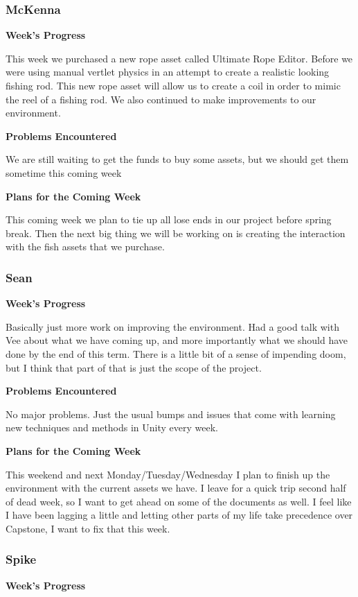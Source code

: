 \documentclass[10pt,journal,compsoc,onecolumn, draftclsnofoot]{IEEEtran}
\begin{document}
\subsubsection{McKenna}
\noindent \textbf{Week's Progress}

This week we purchased a new rope asset called Ultimate Rope Editor. Before we were using manual vertlet physics in an attempt to create a realistic looking fishing rod. This new rope asset will allow us to create a coil in order to mimic the reel of a fishing rod. We also continued to make improvements to our environment.

\noindent \textbf{Problems Encountered}

We are still waiting to get the funds to buy some assets, but we should get them sometime this coming week

\noindent \textbf{Plans for the Coming Week}

This coming week we plan to tie up all lose ends in our project before spring break. Then the next big thing we will be working on is creating the interaction with the fish assets that we purchase.

\subsubsection{Sean}
\noindent \textbf{Week's Progress}

Basically just more work on improving the environment. Had a good talk with Vee about what we have coming up, and more importantly what we should have done by the end of this term. There is a little bit of a sense of impending doom, but I think that part of that is just the scope of the project.

\noindent \textbf{Problems Encountered}

No major problems. Just the usual bumps and issues that come with learning new techniques and methods in Unity every week.

\noindent \textbf{Plans for the Coming Week}

This weekend and next Monday/Tuesday/Wednesday I plan to finish up the environment with the current assets we have. I leave for a quick trip second half of dead week, so I want to get ahead on some of the documents as well. I feel like I have been lagging a little and letting other parts of my life take precedence over Capstone, I want to fix that this week.

\subsubsection{Spike}
\noindent \textbf{Week's Progress}
\end{document}
